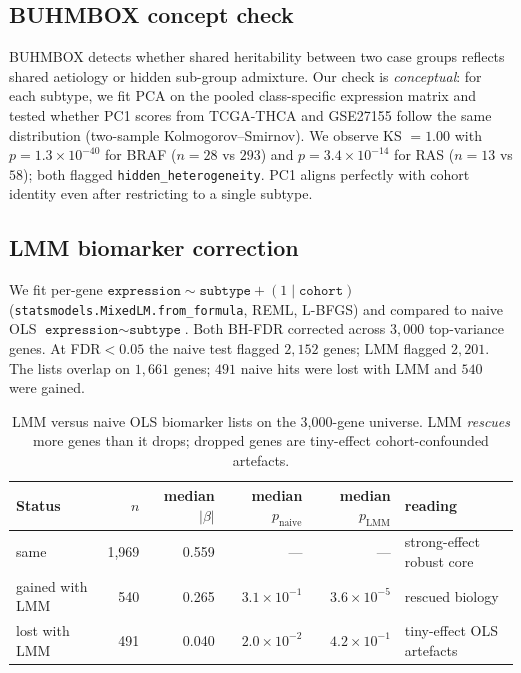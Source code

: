 \documentclass[11pt,a4paper]{article}
\begin{document}
\subsection{BUHMBOX concept check}
\label{sec:S7.2}
BUHMBOX \citep{han2016buhmbox} detects whether shared heritability
between two case groups reflects shared aetiology or hidden sub-group
admixture. Our check is \emph{conceptual}: for each subtype, we fit
PCA on the pooled class-specific expression matrix and tested whether
PC1 scores from TCGA-THCA and GSE27155 follow the same distribution
(two-sample Kolmogorov--Smirnov). We observe KS $= 1.00$ with
$p = 1.3 \times 10^{-40}$ for BRAF ($n = 28$ vs $293$) and
$p = 3.4 \times 10^{-14}$ for RAS ($n = 13$ vs $58$); both flagged
\texttt{hidden\_heterogeneity}. PC1 aligns perfectly with cohort
identity even after restricting to a single subtype.

\subsection{LMM biomarker correction}
\label{sec:S7.3}
We fit per-gene
$\texttt{expression} \sim \texttt{subtype} + (1 \mid \texttt{cohort})$
(\texttt{statsmodels.MixedLM.from\_formula}, REML, L-BFGS) and
compared to naive OLS $\texttt{expression} \sim \texttt{subtype}$.
Both BH-FDR corrected across $3{,}000$ top-variance genes. At
FDR$<0.05$ the naive test flagged $2{,}152$ genes; LMM flagged
$2{,}201$. The lists overlap on $1{,}661$ genes; $491$ naive hits
were lost with LMM and $540$ were gained.

\begin{table}[htbp]
\centering
\small
\begin{tabular}{lrrrrl}\toprule
Status & $n$ & median $|\beta|$ & median $p_{\mathrm{naive}}$ & median $p_{\mathrm{LMM}}$ & reading \\ \midrule
same               & 1{,}969 & 0.559 & --- & --- & strong-effect robust core \\
gained with LMM    & 540     & 0.265 & $3.1 \times 10^{-1}$ & $3.6 \times 10^{-5}$ & rescued biology \\
lost with LMM      & 491     & 0.040 & $2.0 \times 10^{-2}$ & $4.2 \times 10^{-1}$ & tiny-effect OLS artefacts \\
\bottomrule\end{tabular}
\caption{LMM versus naive OLS biomarker lists on the 3{,}000-gene
universe. LMM \emph{rescues} more genes than it drops; dropped genes
are tiny-effect cohort-confounded artefacts.}
\label{tab:s7c}
\end{table}
\end{document}

